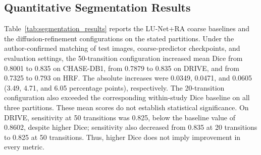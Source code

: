 \documentclass[jimaging,article,submit,pdftex,moreauthors]
  {Definitions/mdpi}
\begin{document}
\subsection{Quantitative Segmentation Results}

Table~\ref{tab:segmentation_results} reports the LU-Net+RA coarse baselines and the diffusion-refinement configurations on the stated partitions. Under the author-confirmed matching of test images, coarse-predictor checkpoints, and evaluation settings, the 50-transition configuration increased mean Dice from 0.8001 to 0.835 on CHASE-DB1, from 0.7879 to 0.835 on DRIVE, and from 0.7325 to 0.793 on HRF. The absolute increases were 0.0349, 0.0471, and 0.0605 (3.49, 4.71, and 6.05 percentage points), respectively. The 20-transition configuration also exceeded the corresponding within-study Dice baseline on all three partitions. These mean scores do not establish statistical significance. On DRIVE, sensitivity at 50 transitions was 0.825, below the baseline value of 0.8602, despite higher Dice; sensitivity also decreased from 0.835 at 20 transitions to 0.825 at 50 transitions. Thus, higher Dice does not imply improvement in every metric.

\begin{table}[htbp]
\centering
\caption{Test-set results from the rerun LU-Net+RA baseline and the diffusion-refinement configurations on eight CHASE-DB1, 20 DRIVE, and 12 HRF images. Matching of test images, coarse-predictor checkpoints, annotations, and evaluation settings is author-confirmed, without independent verification against the original diffusion outputs. Values are single-run point estimates.}
\label{tab:segmentation_results}
\small
{}
\end{table}
\end{document}
